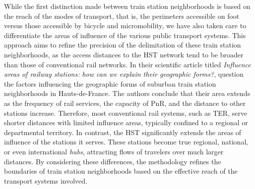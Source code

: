 \begin{refsegment}
While the first distinction made between train station neighborhoods is based on the reach of the modes of transport, that is, the perimeters accessible on foot versus those accessible by bicycle and \gls{micromobility}, we have also taken care to differentiate the areas of influence of the various public transport systems. This approach aims to refine the precision of the delimitation of these train station neighborhoods, as the access distances to the \acrshort{HST} network tend to be broader than those of conventional rail networks. In their scientific article titled \foreignlanguage{english}{\textsl{Influence areas of railway stations: how can we explain their geographic forms?}}, \textcolor{blue}{\textcite[5-6]{hasiak_influence_2016}} question the factors influencing the geographic forms of suburban train station neighborhoods in Hauts-de-France. The authors conclude that their area extends as the frequency of rail services, the capacity of \acrshort{PnR}, and the distance to other stations increase. Therefore, most conventional rail systems, such as \acrshort{TER}, serve shorter distances with limited influence areas, typically confined to a regional or departmental territory. In contrast, the \acrshort{HST} significantly extends the areas of influence of the stations it serves. These stations become true regional, national, or even international \textsl{hubs}, attracting flows of travelers over much larger distances. By considering these differences, the methodology refines the boundaries of train station neighborhoods based on the effective reach of the transport systems involved.%


\end{refsegment}
